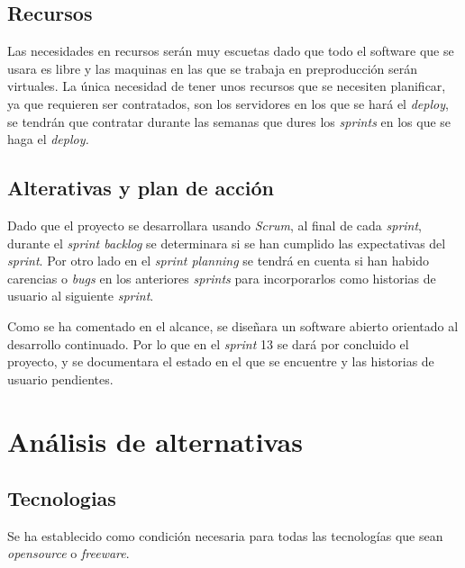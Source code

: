 \documentclass[12pt]{article} %
\begin{document}
\subsection{Recursos}
Las necesidades en recursos serán muy escuetas dado que todo el software que se usara es libre y las maquinas en las que se trabaja en preproducción serán virtuales. La única necesidad de tener unos recursos que se necesiten planificar, ya que requieren ser contratados, son los servidores en los que se hará el \textit{deploy}, se tendrán que contratar durante las semanas que dures los \textit{sprints} en los que se haga el \textit{deploy.}

\subsection{Alterativas y plan de acción}
Dado que el proyecto se desarrollara usando \textit{Scrum}, al final de cada \textit{sprint}, durante el \textit{sprint backlog} se determinara si se han cumplido las expectativas del \textit{sprint}. Por otro lado en el \textit{sprint planning} se tendrá en cuenta si han habido carencias o \textit{bugs} en los anteriores \textit{sprints} para incorporarlos como historias de usuario al siguiente \textit{sprint}. 

Como se ha comentado en el alcance, se diseñara un software abierto orientado al desarrollo continuado. Por lo que en el \textit{sprint} 13 se dará por concluido el proyecto, y se documentara el estado en el que se encuentre y las historias de usuario pendientes.
\newpage

\section{Análisis de alternativas}


\subsection{Tecnologias}
Se ha establecido como condición necesaria para todas las tecnologías que sean \textit{opensource} o \textit{freeware}.
\end{document}
